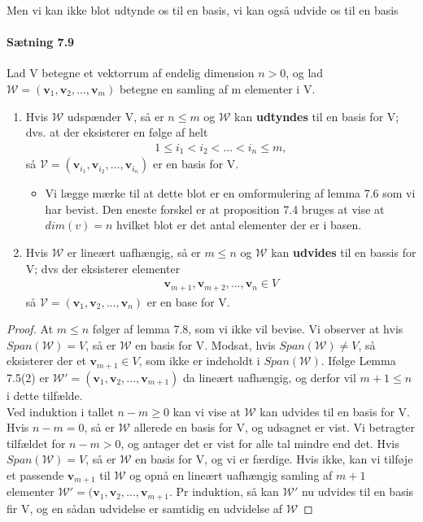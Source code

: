 \documentclass[paper=a4, fontsize=11pt]{scrartcl} %
\begin{document}
	Men vi kan ikke blot udtynde os til en basis, vi kan også udvide os til en basis
	
	\paragraph{Sætning 7.9} Lad V betegne et vektorrum af endelig dimension $n>0$, og lad $\mathcal{W}=(\mathbf{v}_1,\mathbf{v}_2,...,\mathbf{v}_m)$ betegne en samling af m elementer i V.
	\begin{enumerate}
		\item Hvis $\mathcal{W}$ udspænder V, så er $n\leq m$ og $\mathcal{W}$ kan \textbf{udtyndes} til en basis for V; dvs. at der eksisterer en følge af helt
		\begin{align*}
			1\leq i_1 < i_2 <...<i_n \leq m,
		\end{align*}
		så $\mathcal{V}=(\mathbf{v}_{i_1},\mathbf{v}_{i_2},...,\mathbf{v}_{i_n})$ er en basis for V.
		\begin{itemize}
			\item Vi lægge mærke til at dette blot er en omformulering af lemma 7.6 som vi har bevist. Den eneste forskel er at proposition 7.4 bruges at vise at $dim(v)=n$ hvilket blot er det antal elementer der er i basen.
		\end{itemize}
		\item Hvis $\mathcal{W}$ er lineært uafhængig, så er $m\leq n$ og $\mathcal{W}$ kan \textbf{udvides} til en bassis for V; dvs der eksisterer elementer 
		\begin{align*}
			\mathbf{v}_{m+1},\mathbf{v}_{m+2},...,\mathbf{v}_{n}\in V
		\end{align*}
		så $\mathcal{V}=(\mathbf{v}_{1},\mathbf{v}_{2},...,\mathbf{v}_{n})$ er en base for V.
	\end{enumerate}
	
	\begin{proof}
		At $m\leq n$ følger af lemma 7.8, som vi ikke vil bevise. Vi observer at hvis $Span(\mathcal{W})=V$, så er $\mathcal{W}$ en basis for V. Modsat, hvis $Span(\mathcal{W})\neq V$, så eksisterer der et $\mathbf{v}_{m+1}\in V$, som ikke er indeholdt i $Span(\mathcal{W})$. Ifølge Lemma 7.5(2) er $\mathcal{W}'=(\mathbf{v}_1,\mathbf{v}_2,...,\mathbf{v}_{m+1})$ da lineært uafhængig, og derfor vil $m+1\leq n$ i dette tilfælde. \\
		
		Ved induktion i tallet $n-m\geq0$ kan vi vise at $\mathcal{W}$ kan udvides til en basis for V. Hvis $n-m=0$, så er $\mathcal{W}$ allerede en basis for V, og udsagnet er vist. Vi betragter tilfældet for $n-m>0$, og antager det er vist for alle tal mindre end det. Hvis $Span(\mathcal{W})=V$, så er $\mathcal{W}$ en basis for V, og vi er færdige. Hvis ikke, kan vi tilføje et passende $\mathbf{v}_{m+1}$ til $\mathcal{W}$ og opnå en lineært uafhængig samling af $m+1$ elementer $\mathcal{W}'=(\mathbf{v}_1,\mathbf{v}_2,...,\mathbf{v}_{m+1}$. Pr induktion, så kan $\mathcal{W}'$ nu udvides til en basis fir V, og en sådan udvidelse er samtidig en udvidelse af $\mathcal{W}$
	\end{proof}
	
\end{document}
